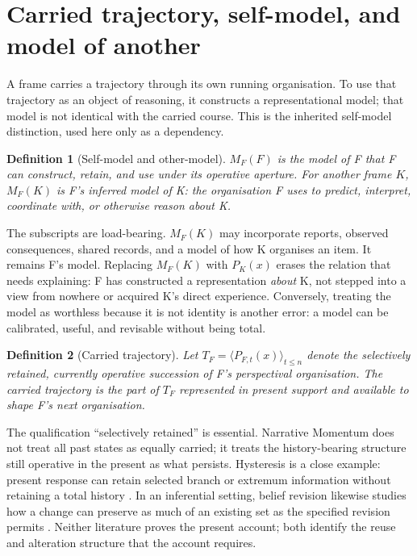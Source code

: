 \documentclass[11pt,a4paper]{article}
\newtheorem{definition}{Definition}[section]
\theoremstyle{remark}
\begin{document}
\section{Carried trajectory, self-model, and model of another}\label{sec:models}
A frame carries a trajectory through its own running organisation. To use that
trajectory as an object of reasoning, it constructs a representational model;
that model is not identical with the carried course. This is the inherited
self-model distinction, used here only as a dependency.

\begin{definition}[Self-model and other-model]
$M_F(F)$ is the model of F that F can construct, retain, and use under its
operative aperture. For another frame $K$, $M_F(K)$ is F's inferred model of K:
the organisation F uses to predict, interpret, coordinate with, or otherwise
reason about K.
\end{definition}

The subscripts are load-bearing. $M_F(K)$ may incorporate reports, observed
consequences, shared records, and a model of how K organises an item. It remains
F's model. Replacing $M_F(K)$ with $P_K(x)$ erases the relation that needs
explaining: F has constructed a representation \emph{about} K, not stepped into
a view from nowhere or acquired K's direct experience. Conversely, treating the
model as worthless because it is not identity is another error: a model can be
calibrated, useful, and revisable without being total.

\begin{definition}[Carried trajectory]
Let $T_F=\langle P_{F,t}(x)\rangle_{t\leq n}$ denote the selectively retained,
currently operative succession of F's perspectival organisation. The carried
trajectory is the part of $T_F$ represented in present support and available to
shape F's next organisation.
\end{definition}

The qualification ``selectively retained'' is essential. Narrative Momentum does
not treat all past states as equally carried; it treats the history-bearing
structure still operative in the present as what persists. Hysteresis is a close
example: present response can retain selected branch or extremum information
without retaining a total history \citep{mayergoyz1991,mayergoyz2003}. In an
inferential setting, belief revision likewise studies how a change can preserve
as much of an existing set as the specified revision permits \citep{agm1985}.
Neither literature proves the present account; both identify the reuse and
alteration structure that the account requires.
\end{document}
